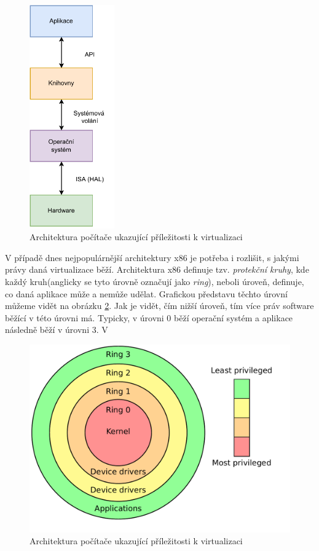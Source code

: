 \begin{figure}[htbp]
    \centering 
    \includegraphics[width=0.325\textwidth]{assets/img/computer_stack.pdf}
    \caption{Architektura počítače ukazující příležitosti k virtualizaci}
    \label{fig:pc_stack}
\end{figure}

V případě dnes nejpopulárnější architektury x86 je potřeba i rozlišit, s jakými právy daná virtualizace běží. Architektura x86 definuje tzv. \textit{protekční kruhy}, kde každý kruh(anglicky se tyto úrovně označují jako \textit{ring}), neboli úroveň, definuje, co daná aplikace může a nemůže udělat. Grafickou představu těchto úrovní můžeme vidět na obrázku \ref{fig:priv_rings}. Jak je vidět, čím nižší úroveň, tím více práv software běžící v této úrovni má. Typicky, v úrovni 0 běží operační systém a aplikace následně běží v úrovni 3. V 


\cite{RODRIGUEZHARO2012267}

\begin{figure}[htbp]
    \centering 
    \includegraphics[width=\textwidth]{assets/img/priv_rings.pdf}
    \caption{Architektura počítače ukazující příležitosti k virtualizaci}
    \label{fig:priv_rings}
\end{figure}

